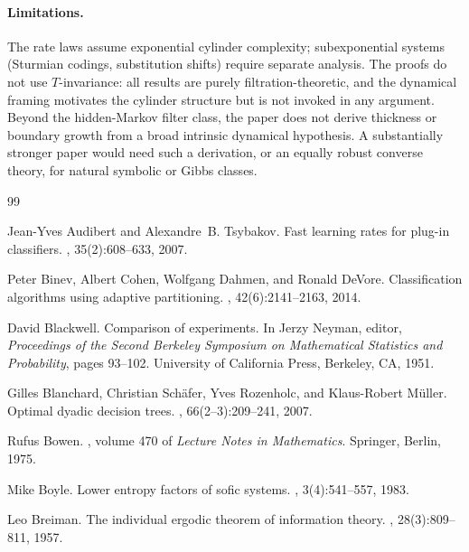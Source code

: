 \paragraph{Limitations.}
The rate laws assume exponential cylinder complexity; subexponential systems
(Sturmian codings, substitution shifts) require separate analysis.  The proofs
do not use $T$-invariance: all results are purely filtration-theoretic, and the
dynamical framing motivates the cylinder structure but is not invoked in any
argument.  Beyond the hidden-Markov filter class, the paper does not derive
thickness or boundary growth from a broad intrinsic dynamical hypothesis.  A
substantially stronger paper would need such a derivation, or an equally
robust converse theory, for natural symbolic or Gibbs classes.

\begin{thebibliography}{99}

Jean-Yves Audibert and Alexandre~B. Tsybakov.
\newblock Fast learning rates for plug-in classifiers.
, 35(2):608--633, 2007.

Peter Binev, Albert Cohen, Wolfgang Dahmen, and Ronald DeVore.
\newblock Classification algorithms using adaptive partitioning.
, 42(6):2141--2163, 2014.

David Blackwell.
\newblock Comparison of experiments.
\newblock In Jerzy Neyman, editor, {\em Proceedings of the Second Berkeley
  Symposium on Mathematical Statistics and Probability}, pages 93--102.
  University of California Press, Berkeley, CA, 1951.

Gilles Blanchard, Christian Sch\"afer, Yves Rozenholc, and Klaus-Robert
  M\"uller.
\newblock Optimal dyadic decision trees.
, 66(2--3):209--241, 2007.

Rufus Bowen.
, volume 470 of {\em Lecture Notes in Mathematics}.
\newblock Springer, Berlin, 1975.

Mike Boyle.
\newblock Lower entropy factors of sofic systems.
, 3(4):541--557, 1983.

Leo Breiman.
\newblock The individual ergodic theorem of information theory.
, 28(3):809--811, 1957.


\end{thebibliography}
